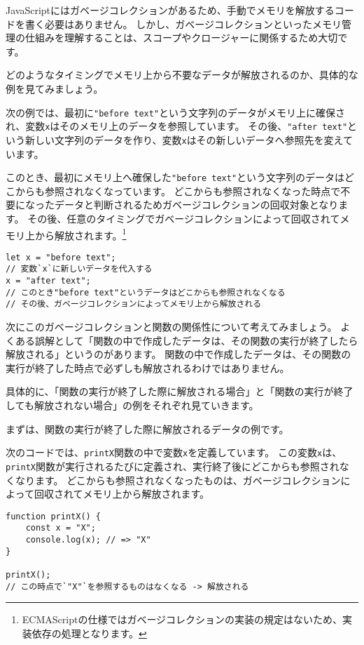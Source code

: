 JavaScriptにはガベージコレクションがあるため、手動でメモリを解放するコードを書く必要はありません。
しかし、ガベージコレクションといったメモリ管理の仕組みを理解することは、スコープやクロージャーに関係するため大切です。

どのようなタイミングでメモリ上から不要なデータが解放されるのか、具体的な例を見てみましょう。

次の例では、最初に\texttt{"before text"}という文字列のデータがメモリ上に確保され、変数\texttt{x}はそのメモリ上のデータを参照しています。
その後、\texttt{"after text"}という新しい文字列のデータを作り、変数\texttt{x}はその新しいデータへ参照先を変えています。

このとき、最初にメモリ上へ確保した\texttt{"before text"}という文字列のデータはどこからも参照されなくなっています。
どこからも参照されなくなった時点で不要になったデータと判断されるためガベージコレクションの回収対象となります。
その後、任意のタイミングでガベージコレクションによって回収されてメモリ上から解放されます。\footnote{ECMAScriptの仕様ではガベージコレクションの実装の規定はないため、実装依存の処理となります。}

\begin{lstlisting}
let x = "before text";
// 変数`x`に新しいデータを代入する
x = "after text";
// このとき"before text"というデータはどこからも参照されなくなる
// その後、ガベージコレクションによってメモリ上から解放される
\end{lstlisting}

次にこのガベージコレクションと関数の関係性について考えてみましょう。
よくある誤解として「関数の中で作成したデータは、その関数の実行が終了したら解放される」というのがあります。
関数の中で作成したデータは、その関数の実行が終了した時点で必ずしも解放されるわけではありません。

具体的に、「関数の実行が終了した際に解放される場合」と「関数の実行が終了しても解放されない場合」の例をそれぞれ見ていきます。

まずは、関数の実行が終了した際に解放されるデータの例です。

次のコードでは、\texttt{printX}関数の中で変数\texttt{x}を定義しています。
この変数\texttt{x}は、\texttt{printX}関数が実行されるたびに定義され、実行終了後にどこからも参照されなくなります。
どこからも参照されなくなったものは、ガベージコレクションによって回収されてメモリ上から解放されます。

\begin{lstlisting}
function printX() {
    const x = "X";
    console.log(x); // => "X"
}

printX();
// この時点で`"X"`を参照するものはなくなる -> 解放される
\end{lstlisting}

